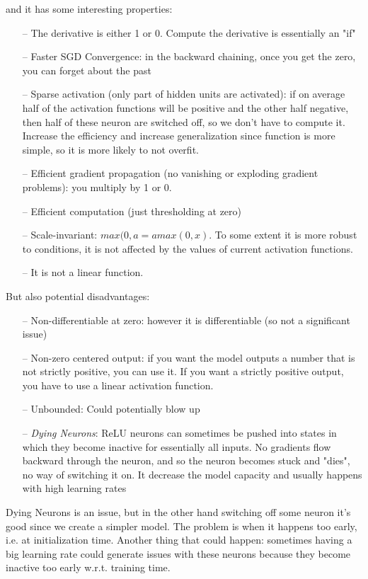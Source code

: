 and it has some interesting properties:
\begin{itemize}
    \item[--] The derivative is either 1 or 0. Compute the derivative is essentially an "if"
    \item[--] Faster SGD Convergence: in the backward chaining, once you get the zero, you can forget about the past
    \item[--] Sparse activation (only part of hidden units are activated):  if on average half of the activation functions will be positive and the other half negative, then half of these neuron are switched off, so we don't have to compute it. Increase the efficiency and increase generalization since function is more simple, so it is more likely to not overfit.
    \item[--] Efficient gradient propagation (no vanishing or exploding gradient problems): you multiply by 1 or 0. 
    \item[--] Efficient computation (just thresholding at zero)
    \item[--] Scale-invariant: $max(0,a = a max(0,x)$. To some extent it is more robust to conditions, it is not affected by the values of current activation functions. 
    \item[--] It is not a linear function. 
\end{itemize}{}

But also potential disadvantages:
\begin{itemize}
    \item[--] Non-differentiable at zero: however it is differentiable (so not a significant issue)
    \item[--] Non-zero centered output: if you want the model outputs a number that is not strictly positive, you can use it. If you want a strictly positive output, you have to use a linear activation function.
    \item[--] Unbounded: Could potentially blow up
    \item[--] \textit{Dying Neurons}: ReLU neurons can sometimes be pushed into states in which they become inactive for essentially all inputs. No gradients flow backward through the neuron, and so the neuron becomes stuck and "dies", no way of switching it on. It decrease the model capacity and usually happens with high learning rates
\end{itemize}{}

Dying Neurons is an issue, but in the other hand switching off some neuron it's good since we create a simpler model. The problem is when it happens too early, i.e. at initialization time. Another thing that could happen: sometimes having a big learning rate could generate issues with these neurons because they become inactive too early w.r.t. training time.

